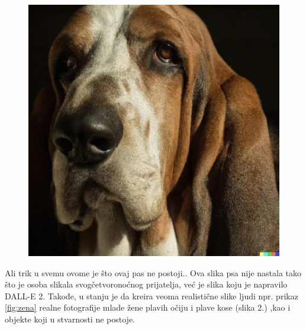 \documentclass[a4paper]{article}
\begin{document}
\begin{figure}[h!]
\begin{center}
\includegraphics[scale=0.10]{pas.jpg}
\end{center}
\label{fig:pas}
\end{figure}

Ali trik u svemu ovome je što ovaj pas ne postoji.. Ova slika psa nije nastala tako što je osoba slikala svogčetvoronoćnog prijatelja, već je slika koju je napravilo DALL-E 2. Takođe, u stanju je da kreira veoma realistične slike ljudi npr. prikaz \ref{fig:zena}  realne fotografije mlade žene plavih očiju i plave kose (slika 2.) ,kao i objekte koji u stvarnosti ne postoje.
\end{document}
